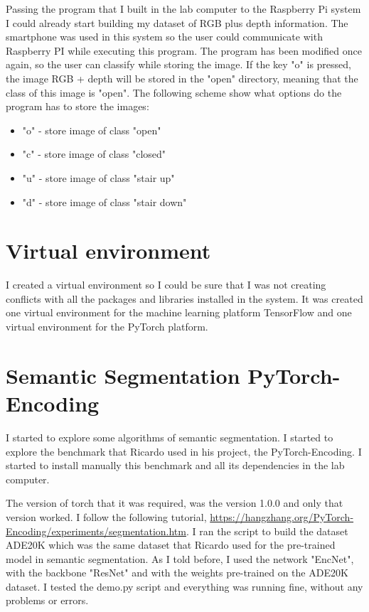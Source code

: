     \bigskip
    
    Passing the program that I built in the lab computer to the Raspberry Pi system I could already start building my dataset of RGB plus depth information. The smartphone was used in this system so the user could communicate with Raspberry PI while executing this program. The program has been modified once again, so the user can classify while storing the image. If the key "o" is pressed, the image RGB + depth will be stored in the "open" directory, meaning that the class of this image is "open". The following scheme show what options do the program has to store the images:

    
    \begin{itemize}
        \item "o" - store image of class "open"
        \item "c" - store image of class "closed"
        \item "u" - store image of class "stair up"
        \item "d" - store image of class "stair down"
    \end{itemize}

    \section{Virtual environment}

    I created a virtual environment so I could be sure that I was not creating conflicts with all the packages and libraries installed in the system. It was created one virtual environment for the machine learning platform TensorFlow and one virtual environment for the PyTorch platform. 

    \section{Semantic Segmentation PyTorch-Encoding}
    
    I started to explore some algorithms of semantic segmentation. I started to explore the benchmark that Ricardo used in his project, the PyTorch-Encoding. I started to install manually this benchmark and all its dependencies in the lab computer. 
    
    The version of torch that it was required, was the version 1.0.0 and only that version worked. I follow the following tutorial, \url{https://hangzhang.org/PyTorch-Encoding/experiments/segmentation.htm}. I ran the script to build the dataset ADE20K which was the same dataset that Ricardo used for the pre-trained model in semantic segmentation. As I told before, I used the network "EncNet", with the backbone "ResNet" and with the weights pre-trained on the ADE20K dataset. I tested the demo.py script and everything was running fine, without any problems or errors.


